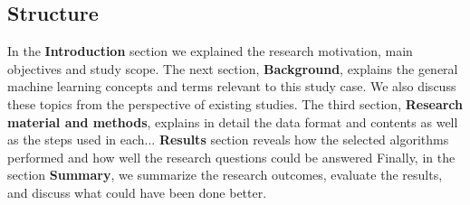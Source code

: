 

\subsection{Structure}\label{subsec:intro-structure}

In the \textbf{Introduction} section
we explained the research motivation,
main objectives and study scope.
The next section, \textbf{Background},
explains %
the general machine learning concepts
and terms relevant to this study case.
We also discuss these topics from the perspective of
existing studies. %
The third section,
\textbf{Research material and methods},
explains in detail %
the data format and contents
as well as the steps used in each... %
\textbf{Results} section reveals how the selected algorithms performed
and how well the research questions could be answered %
Finally,
in the section \textbf{Summary},
we summarize the research outcomes,
evaluate the results,
and discuss what could have been done better. %

\clearpage



